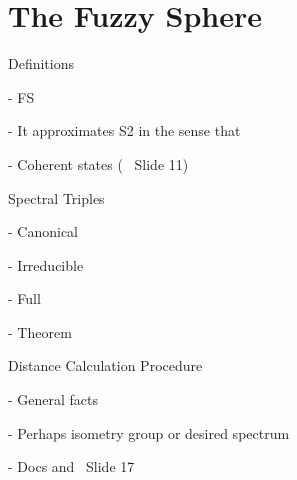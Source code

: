 \section{The Fuzzy Sphere}

\begin{frame}{Definitions} %
    
    - FS
    
    - It approximates S2 in the sense that
    
    - Coherent states (~ Slide 11)
    
\end{frame}


\begin{frame}{Spectral Triples} %
    
     - Canonical
     
     - Irreducible
     
     - Full
     
     - Theorem
    
\end{frame}


\begin{frame}{Distance Calculation Procedure} %
    
     - General facts
     
     - Perhaps isometry group or desired spectrum
     
     - Docs and ~Slide 17
    
\end{frame}